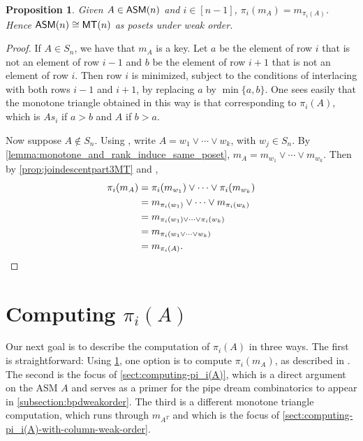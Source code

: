 \documentclass[12 pt]{amsart}
\newtheorem{proposition}[Theorem]{Proposition}
\numberwithin{equation}{section}
\theoremstyle{remark}
\newcommand{\asm}{{\sf ASM}}
\newcommand{\monotone}{{\sf MT}}
\begin{document}
\begin{proposition}
    \label{weak_order_isomorphism}
    Given $A \in \asm(n)$ and $i \in [n-1]$, $\pi_i(m_A) = m_{\pi_i(A)}$. Hence $\asm(n) \cong \monotone(n)$ as posets under weak order.
    \end{proposition}
\begin{proof}
If $A \in S_n$, we have that $m_A$ is a key. Let $a$ be the element of row $i$ that is not an element of row $i-1$ and $b$ be the element of row $i+1$ that is not an element of row $i$. Then row $i$ is minimized, subject to the conditions of interlacing with both rows $i-1$ and $i+1$, by replacing $a$ by $\min\{a,b\}$. One sees easily that the monotone triangle obtained in this way is that corresponding to $\pi_i(A)$, which is $As_i$ if $a>b$ and $A$ if $b>a$.

Now suppose $A\not \in S_n$.
    Using \cite[Theorem 4.4]{LS96}, write $A = w_1 \vee \cdots \vee w_k$,  with $w_j \in S_n$. By \cref{lemma:monotone_and_rank_induce_same_poset}, $m_A = m_{w_1} \vee \cdots \vee m_{w_k}$. Then by \cref{prop:joindescentpart3MT} and \cite[Proposition 3.4]{EKW-main},
    \begin{align*}
\pi_i(m_A) &= \pi_i(m_{w_1}) \vee \cdots \vee \pi_i(m_{w_k}) \\
&= m_{\pi_i({w_1})} \vee \cdots \vee m_{\pi_i(w_k)}\\
& = m_{\pi_i({w_1}) \vee \cdots \vee \pi_i(w_k)}\\
& = m_{\pi_i(w_1 \vee \cdots \vee w_k)}\\
& = m_{\pi_i(A)}. \qedhere
    \end{align*} 
\end{proof}



\section{Computing $\pi_i(A)$}
\label{sect:computing}

Our next goal is to describe the computation of  $\pi_i(A)$ in three ways. The first is straightforward: Using \cref{weak_order_isomorphism}, one option is to compute $\pi_i(m_A)$, as described in \cite{HR20}.  The second is the focus of \cref{sect:computing-pi_i(A)}, which is a direct argument on the ASM $A$ and serves as a primer for the pipe dream combinatorics to appear in \cref{subsection:bpdweakorder}. The third is a different monotone triangle computation, which runs through $m_{A^T}$ and which is the focus of \cref{sect:computing-pi_i(A)-with-column-weak-order}. 
\end{document}
